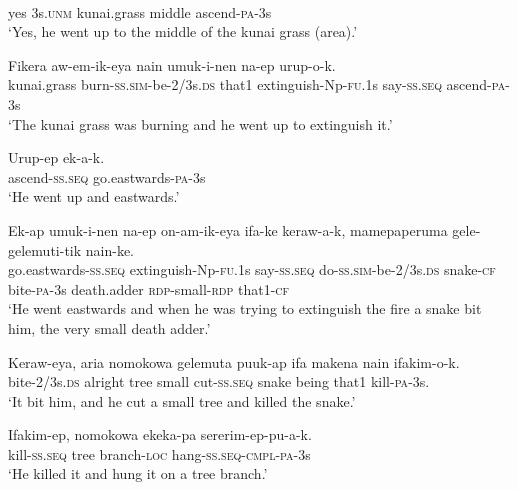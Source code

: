 {\ea\label{ex:a:x2}
 \\
yes  3s.\textsc{unm}  kunai.grass  middle  ascend-\textsc{pa}-3s \\
\glt ‘Yes, he went up to the middle of the kunai grass (area).’ \\
\z


\ea\label{ex:a:x3}
\gll  Fikera  aw-em-ik-eya  nain  umuk-i-nen                       na-ep{  urup-o-k.} \\
kunai.grass  burn-\textsc{ss}.\textsc{sim}-be-2/3s.\textsc{ds}  that1  extinguish-Np-\textsc{fu}.1s    say-\textsc{ss.seq}  ascend-\textsc{pa}-3s \\


\glt ‘The kunai grass was burning and he went up to extinguish it.’ \\
\z


\ea\label{ex:a:x4}
\gll  Urup-ep  ek-a-k. \\
ascend-\textsc{ss.seq}  go.eastwards-\textsc{pa}-3s \\
\glt ‘He went up and eastwards.’ \\
\z


\ea\label{ex:a:x5}
\gll  Ek-ap  umuk-i-nen  na-ep                        on-am-ik-eya  ifa-ke  keraw-a-k,  mamepaperuma             {gele-gelemuti-tik  nain-ke.} \\
go.eastwards-\textsc{ss.seq}  extinguish-Np-\textsc{fu}.1s  say-\textsc{ss.seq}  do-\textsc{ss}.\textsc{sim}-be-2/3s.\textsc{ds}  snake-\textsc{cf}  bite-\textsc{pa}-3s  death.adder    \textsc{rdp}-small-\textsc{rdp}  that1-\textsc{cf} \\




\glt ‘He went eastwards and when he was trying to extinguish the fire a snake bit him, the very small death adder.’ \\
\z


\ea\label{ex:a:x6}
\gll  Keraw-eya,  aria  nomokowa  gelemuta  puuk-ap  ifa  makena  nain{  ifakim-o-k.} \\
bite-2/3s.\textsc{ds}  alright  tree  small  cut-\textsc{ss.seq}  snake  being      that1  kill-\textsc{pa}-3s. \\


\glt ‘It bit him, and he cut a small tree and killed the snake.’ \\
\z


\ea\label{ex:a:x7}
\gll  Ifakim-ep,  nomokowa  ekeka-pa  sererim-ep-pu-a-k. \\
kill-\textsc{ss.seq}  tree  branch-\textsc{loc}  hang-\textsc{ss.seq}-\textsc{cmpl}-\textsc{pa}-3s \\
\glt ‘He killed it and hung it on a tree branch.’ \\
\z


}
